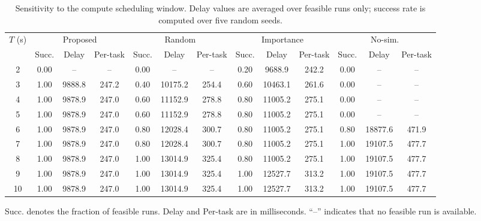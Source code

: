 \begin{table}[t]
\centering
\caption{Sensitivity to the compute scheduling window. Delay values are averaged over feasible runs only; success rate is computed over five random seeds.}
\label{tab:compute_window_sensitivity}
\setlength{\tabcolsep}{4.5pt}
\begin{tabular}{ccccccccccccc}
\toprule
\multirow{2}{*}{$T$ (s)} & \multicolumn{3}{c}{Proposed} & \multicolumn{3}{c}{Random} & \multicolumn{3}{c}{Importance} & \multicolumn{3}{c}{No-sim.} \\
 & Succ. & Delay & Per-task & Succ. & Delay & Per-task & Succ. & Delay & Per-task & Succ. & Delay & Per-task \\
\midrule
2 & 0.00 & -- & -- & 0.00 & -- & -- & 0.20 & 9688.9 & 242.2 & 0.00 & -- & -- \\
3 & 1.00 & 9888.8 & 247.2 & 0.40 & 10175.2 & 254.4 & 0.60 & 10463.1 & 261.6 & 0.00 & -- & -- \\
4 & 1.00 & 9878.9 & 247.0 & 0.60 & 11152.9 & 278.8 & 0.80 & 11005.2 & 275.1 & 0.00 & -- & -- \\
5 & 1.00 & 9878.9 & 247.0 & 0.60 & 11152.9 & 278.8 & 0.80 & 11005.2 & 275.1 & 0.00 & -- & -- \\
6 & 1.00 & 9878.9 & 247.0 & 0.80 & 12028.4 & 300.7 & 0.80 & 11005.2 & 275.1 & 0.80 & 18877.6 & 471.9 \\
7 & 1.00 & 9878.9 & 247.0 & 0.80 & 12028.4 & 300.7 & 0.80 & 11005.2 & 275.1 & 1.00 & 19107.5 & 477.7 \\
8 & 1.00 & 9878.9 & 247.0 & 1.00 & 13014.9 & 325.4 & 0.80 & 11005.2 & 275.1 & 1.00 & 19107.5 & 477.7 \\
9 & 1.00 & 9878.9 & 247.0 & 1.00 & 13014.9 & 325.4 & 1.00 & 12527.7 & 313.2 & 1.00 & 19107.5 & 477.7 \\
10 & 1.00 & 9878.9 & 247.0 & 1.00 & 13014.9 & 325.4 & 1.00 & 12527.7 & 313.2 & 1.00 & 19107.5 & 477.7 \\
\bottomrule
\end{tabular}
\vspace{2pt}
\begin{flushleft}
\footnotesize Succ. denotes the fraction of feasible runs. Delay and Per-task are in milliseconds. ``--'' indicates that no feasible run is available.
\end{flushleft}
\end{table}
